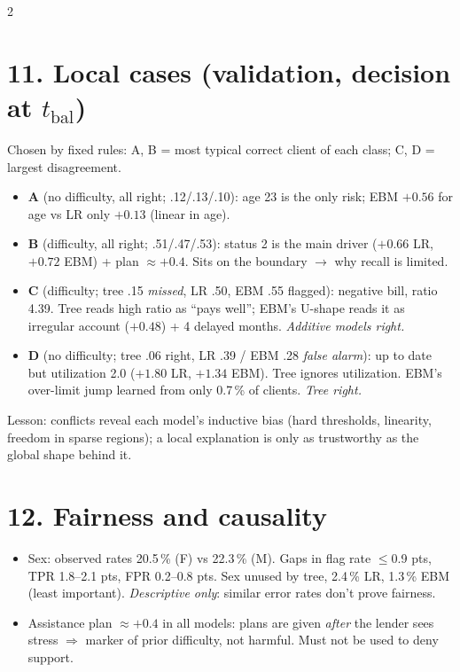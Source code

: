 \documentclass[a4paper,9pt]{extarticle}
\begin{document}
\begin{multicols}{2}
\section{11. Local cases (validation, decision at $t_{\text{bal}}$)}
Chosen by fixed rules: A, B = most typical correct client of each class; C, D = largest disagreement.
\begin{itemize}
\item \textbf{A} (no difficulty, all right; .12/.13/.10): age 23 is the only risk; EBM $+0.56$ for age vs
      LR only $+0.13$ (linear in age).
\item \textbf{B} (difficulty, all right; .51/.47/.53): status 2 is the main driver ($+0.66$ LR, $+0.72$ EBM) +
      plan $\approx+0.4$. Sits on the boundary $\to$ why recall is limited.
\item \textbf{C} (difficulty; tree .15 \emph{missed}, LR .50, EBM .55 flagged): negative bill, ratio 4.39.
      Tree reads high ratio as ``pays well''; EBM's U-shape reads it as irregular account ($+0.48$) + 4 delayed
      months. \emph{Additive models right.}
\item \textbf{D} (no difficulty; tree .06 right, LR .39 / EBM .28 \emph{false alarm}): up to date but
      utilization 2.0 ($+1.80$ LR, $+1.34$ EBM). Tree ignores utilization. EBM's over-limit jump learned from
      only 0.7\,\% of clients. \emph{Tree right.}
\end{itemize}
Lesson: conflicts reveal each model's inductive bias (hard thresholds, linearity, freedom in sparse regions);
a local explanation is only as trustworthy as the global shape behind it.

\section{12. Fairness and causality}
\begin{itemize}
\item Sex: observed rates 20.5\,\% (F) vs 22.3\,\% (M). Gaps in flag rate $\leq$0.9 pts, TPR 1.8--2.1 pts,
      FPR 0.2--0.8 pts. Sex unused by tree, 2.4\,\% LR, 1.3\,\% EBM (least important). \emph{Descriptive only}:
      similar error rates don't prove fairness.
\item Assistance plan $\approx+0.4$ in all models: plans are given \emph{after} the lender sees stress
      $\Rightarrow$ marker of prior difficulty, not harmful. Must not be used to deny support.
\end{itemize}


\end{multicols}
\end{document}
